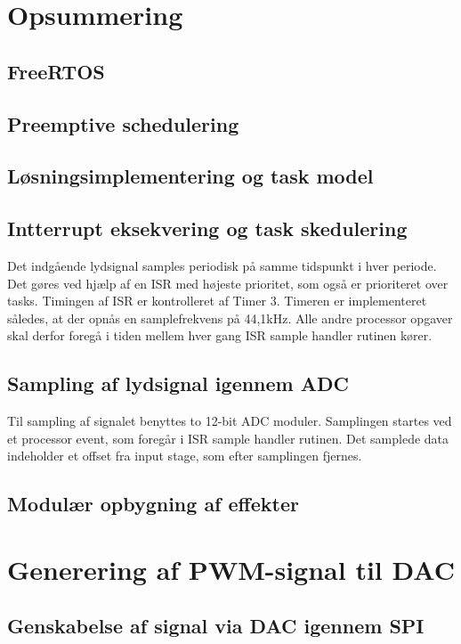 \section{Opsummering}

\subsection{FreeRTOS}


\subsection{Preemptive schedulering}


\subsection{Løsningsimplementering og task model}


\subsection{Intterrupt eksekvering og task skedulering}
Det indgående lydsignal samples periodisk på samme tidspunkt i hver periode. 
Det gøres ved hjælp af en ISR med højeste prioritet, som også er prioriteret over tasks. 
Timingen af ISR er kontrolleret af Timer 3.
Timeren er implementeret således, at der opnås en samplefrekvens på 44,1kHz. 
Alle andre processor opgaver skal derfor foregå i tiden mellem hver gang ISR sample handler rutinen kører. 

\subsection{Sampling af lydsignal igennem ADC}
Til sampling af signalet benyttes to 12-bit ADC moduler. 
Samplingen startes ved et processor event, som foregår i ISR sample handler rutinen. 
Det samplede data indeholder et offset fra input stage, som efter samplingen fjernes. 

\subsection{Modulær opbygning af effekter}


\section{Generering af PWM-signal til DAC}


\subsection{Genskabelse af signal via DAC igennem SPI}


